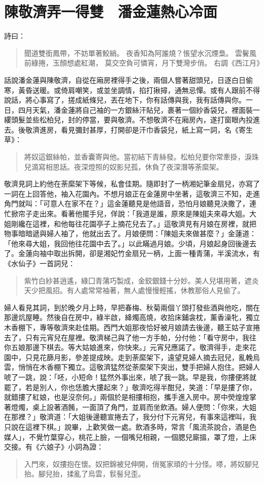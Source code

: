 
\chapter{陳敬濟弄一得雙　潘金蓮熱心冷面}

詩曰：
\begin{quote}
聞道雙銜鳳帶，不妨單著鮫綃。
夜香知為阿誰燒？悵望水沉煙梟。
雲鬢風前綠捲，玉顏想處紅潮，
莫交空負可憐宵，月下雙灣步俏。
右調《西江月》
\end{quote}

話說潘金蓮與陳敬濟，自從在廂房裡得手之後，兩個人嘗著甜頭兒，日逐白日偷寒，黃昏送暖。或倚肩嘲笑，或並坐調情，掐打揪撏，通無忌憚。或有人跟前不得說話，將心事寫了，搓成紙條兒，丟在地下，你有話傳與我，我有話傳與你。一日，四月天氣，潘金蓮將自己袖的一方銀絲汗貼兒，裹著一個紗香袋兒，裡面裝一縷頭髮並些松柏兒，封的停當，要與敬濟。不想敬濟不在廂房內，遂打窗眼內投進去。後敬濟進房，看見彌封甚厚，打開卻是汗巾香袋兒，紙上寫一詞，名《寄生草》：
\begin{quote}
將奴這銀絲帕，並香囊寄與他。當初結下青絲發。松柏兒要你常牽掛，淚珠兒滴寫相思話。夜深燈照的奴影兒孤，休負了夜深潛等荼縻架。
\end{quote}

敬濟見詞上約他在荼縻架下等候，私會佳期。隨即封了一柄湘妃筆金扇兒，亦寫了一詞在上回答他，袖入花園內。不想月娘正在金蓮房中坐著，這敬濟三不知，走進角門就叫：「可意人在家不在？」這金蓮聽見是他語音，恐怕月娘聽見決撒了，連忙掀帘子走出來。看著他擺手兒，佯說：「我道是誰，原來是陳姐夫來尋大姐。大姐剛纔在這裡，和他每往花園亭子上摘花兒去了。」這敬濟見有月娘在房裡，就把物事暗暗遞與婦人袖了，他就出去了。月娘便問：「陳姐夫來做甚麼？」金蓮道：「他來尋大姐，我回他往花園中去了。」以此瞞過月娘。少頃，月娘起身回後邊去了。金蓮向袖中取出拆開，卻是湘妃竹金扇兒一柄，上面一種青蒲，半溪流水，有《水仙子》一首詞兒：
\begin{quote}
紫竹白紗甚逍遙，綠囗青蒲巧製成，金鉸銀錢十分妙。美人兒堪用著，遮炎天少把風招。有人處常常袖著，無人處慢慢輕搖，休教那俗人見偷了。
\end{quote}

婦人看見其詞，到於晚夕月上時，早把春梅、秋菊兩個丫頭打發些酒與他吃，關在那邊炕屋睡。然後自在房中，綠半啟，絳燭高燒，收拾床鋪衾枕，薰香澡牝，獨立木香棚下，專等敬濟來赴佳期。西門大姐那夜恰好被月娘請去後邊，聽王姑子宣捲去了，只有元宵兒在屋裡。敬濟梯己與了他一方手帕，分付他：「看守房中，我往你五娘那邊下棋去。等大姑娘進來，你快來。」元宵兒應諾了。敬濟得手，走來花園中，只見花篩月影，參差提成映。走到荼縻架下，遠望見婦人摘去冠兒，亂輓烏雲，悄悄在木香棚下獨立。這敬濟猛然從荼縻架下突出，雙手把婦人抱住。把婦人唬了一跳，說：「呸，小短命！猛然外事出來，唬了我一跳。早是我，你摟便將就罷了，若是別人，你也恁膽大摟起來？」敬濟吃得半酣兒，笑道：「早是摟了你，就錯摟了紅娘，也是沒奈何。」兩個於是相摟相抱，攜手進入房中。房中熒煌煌掌著燈燭，桌上設著酒餚，一面頂了角門，並肩而坐飲酒。婦人便問：「你來，大姐在那裡？」敬濟道：「大姐後邊聽宣捲去了，我分付下元宵兒，有事來這裡叫，我只說在這裡下棋。」說畢，上歡笑做一處。飲酒多時，常言「風流茶說合，酒是色媒人」，不覺竹葉穿心，桃花上臉，一個嘴兒相親，一個腮兒廝搵，罩了燈，上床交接。有《六娘子》小詞為證：
\begin{quote}
入門來，奴摟抱在懷。奴把錦被兒伸開，俏冤家頑的十分怪。嗏，將奴腳兒抬。腳兒抬，揉亂了烏雲，䯼髻兒歪。
\end{quote}

